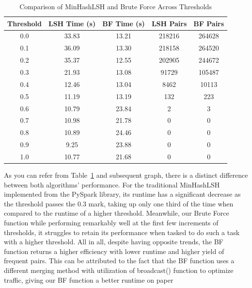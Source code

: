 \begin{table}[h]
    \centering
    \caption{Comparison of MinHashLSH and Brute Force Across Thresholds}
    \begin{tabular}{|c|c|c|c|c|}
        \hline
        \textbf{Threshold} & \textbf{LSH Time (s)} & \textbf{BF Time (s)} & \textbf{LSH Pairs} & \textbf{BF Pairs} \\
        \hline
        0.0 & 33.83 & 13.21 & 218216 & 264628 \\
        0.1 & 36.09 & 13.30 & 218158 & 264520 \\
        0.2 & 35.37 & 12.55 & 202905 & 244672 \\
        0.3 & 21.93 & 13.08 & 91729  & 105487 \\
        0.4 & 12.46 & 13.04 & 8462   & 10113  \\
        0.5 & 11.19 & 13.19 & 132    & 223    \\
        0.6 & 10.79 & 23.84 & 2      & 3      \\
        0.7 & 10.98 & 21.78 & 0      & 0      \\
        0.8 & 10.89 & 24.46 & 0      & 0      \\
        0.9 & 9.25  & 23.88 & 0      & 0      \\
        1.0 & 10.77 & 21.68 & 0      & 0      \\
        \hline
    \end{tabular}
    \label{tab:comparison}
\end{table}

As you can refer from Table~\ref{tab:comparison} and subsequent graph, there is a distinct difference between both algorithms' performance.
For the traditional MinHashLSH implemented from the PySpark library, its runtime has a significant decrease as the threshold passes the 0.3 mark, taking up only one third of the time when compared to the runtime of a higher threshold.
Meanwhile, our Brute Force function while performing remarkably well at the first few increments of thresholds, it struggles to retain its performance when tasked to do such a task with a higher threshold.
All in all, despite having opposite trends, the BF function returns a higher efficiency with lower runtime and higher yield of frequent pairs.
This can be attributed to the fact that the BF function uses a different merging method with utilization of broadcast() function to optimize traffic, giving our BF function a better runtime on paper

